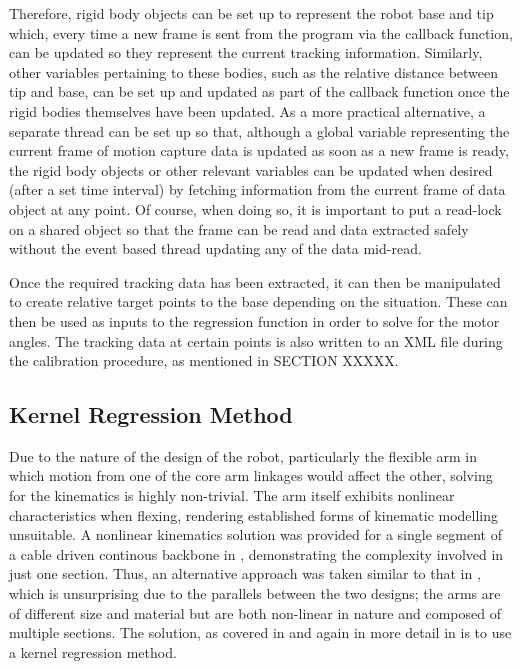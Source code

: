 \documentclass[11pt]{article}
\begin{document}
Therefore, rigid body objects can be set up to represent the robot base and tip which, every time a new frame is sent from the program via the callback function, can be updated so they represent the current tracking information. Similarly, other variables pertaining to these bodies, such as the relative distance between tip and base, can be set up and updated as part of the callback function once the rigid bodies themselves have been updated. As a more practical alternative, a separate thread can be set up so that, although a global variable representing the current frame of motion capture data is updated as soon as a new frame is ready, the rigid body objects or other relevant variables can be updated when desired (after a set time interval) by fetching information from the current frame of data object at any point. Of course, when doing so, it is important to put a read-lock on a shared object so that the frame can be read and data extracted safely without the event based thread updating any of the data mid-read.

Once the required tracking data has been extracted, it can then be manipulated to create relative target points to the base depending on the situation. These can then be used as inputs to the regression function in order to solve for the motor angles. The tracking data at certain points is also written to an XML file during the calibration procedure, as mentioned in SECTION XXXXX. 

\subsection{Kernel Regression Method}
Due to the nature of the design of the robot, particularly the flexible arm in which motion from one of the core arm linkages would affect the other, solving for the kinematics is highly non-trivial. The arm itself exhibits nonlinear characteristics when flexing, rendering established forms of kinematic modelling unsuitable. A nonlinear kinematics solution was provided for a single segment of a cable driven continous backbone in \cite{li2002}, demonstrating the complexity involved in just one section. Thus, an alternative approach was taken similar to that in \cite{GreggSmithDesign}, which is unsurprising due to the parallels between the two designs; the arms are of different size and material but are both non-linear in nature and composed of multiple sections. The solution, as covered in \cite{GreggSmithDesign} and again in more detail in \cite{GreggSmithPhd} is to use a kernel regression method.
\end{document}
